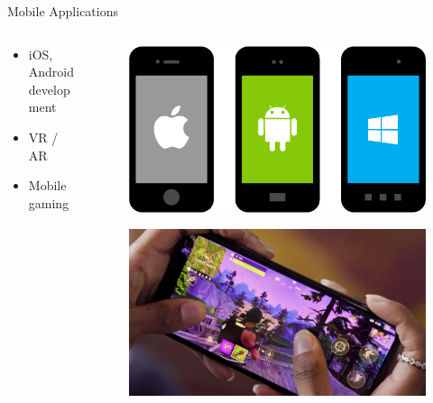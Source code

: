 \documentclass{beamer}
\begin{document}
\begin{frame}{Mobile Applications}
\begin{columns}
	\begin{column}{.40\textwidth}
		\begin{itemize}
			\item iOS, Android development
			\item VR / AR
			\item Mobile gaming
		\end{itemize}
	\end{column}
	\begin{column}{.60\textwidth}
		\begin{figure}
			\includegraphics[width=\linewidth]{img/appdev1.png}
		\end{figure}
		\begin{figure}
			\includegraphics[width=\linewidth]{img/fnapp.png}
		\end{figure}
	\end{column}
\end{columns}
\end{frame}
\end{document}

